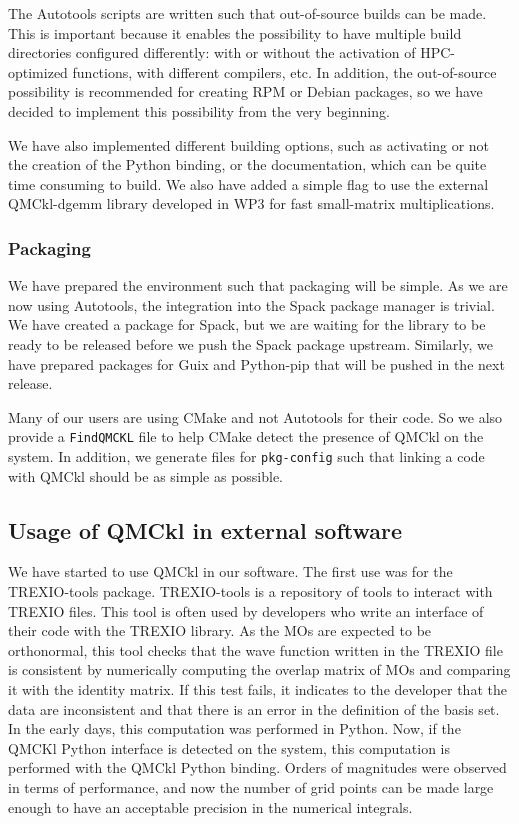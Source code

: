 The Autotools scripts are written such that out-of-source builds can
be made. This is important because it enables the possibility to have
multiple build directories configured differently: with or without the
activation of HPC-optimized functions, with different compilers, etc.
In addition, the out-of-source possibility is recommended for creating RPM
or Debian packages, so we have decided to implement this possibility
from the very beginning.

We have also implemented different building options, such as
activating or not the creation of the Python binding, or the
documentation, which can be quite time consuming to build. We also have
added a simple flag to use the external QMCkl-dgemm library developed in WP3 for
fast small-matrix multiplications.

\subsubsection{Packaging}

We have prepared the environment such that packaging will be
simple. As we are now using Autotools, the integration into the Spack
package manager\cite{spack} is trivial. We have created a package for Spack, but
we are waiting for the library to be ready to be released before we
push the Spack package upstream.
Similarly, we have prepared packages for Guix\cite{guix} and Python-pip that
will be pushed in the next release.

Many of our users are using CMake and not Autotools for their code. So
we also provide a \texttt{FindQMCKL} file to help CMake detect
the presence of QMCkl on the system. In addition, we generate files for
\texttt{pkg-config} such that linking a code with QMCkl should be as
simple as possible.

\subsection{Usage of QMCkl in external software}

We have started to use QMCkl in our software. The first use was for
the TREXIO-tools package.
TREXIO-tools is a repository of tools to interact with TREXIO files.
This tool is often used by developers who write an interface of their code with
the TREXIO library. As the \acp{MO} are expected to be orthonormal,
this tool checks that the wave function written in the TREXIO file is
consistent by numerically computing the overlap matrix of \acp{MO} and
comparing it with the identity matrix. If this test fails, it indicates to the
developer that the data are inconsistent and that there is an error in the
definition of the basis set.
In the early days, this computation was performed in Python. Now, if
the QMCKl Python interface is detected on the system, this computation
is performed with the QMCkl Python binding. Orders of magnitudes were
observed in terms of performance, and now the number of grid points can be made large enough to have an acceptable precision in the
numerical integrals.

